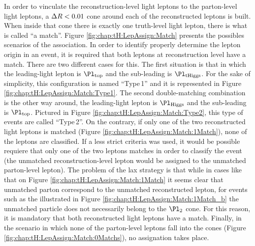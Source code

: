 In order to vinculate the reconstruction-level light leptons to the parton-level light leptons, a \(\Delta R < 0.01\) cone around
each of the reconstructed leptons is built. When inside that cone there is exactly one truth-level light lepton,
there is what is called ``a match''. Figure \ref{fig:chap:tH:LepAssign:Match} presents the possibles scenarios
of the association. In order to identify properly determine the lepton origin in an event, it is required that both leptons
at reconstruction level have a match. There are two different cases for this.
The first situation is that in which the leading-light lepton is $\Pl_{\text{top}}$ and the sub-leading is $\Pl_{\text{tHiggs}}$. For the 
sake of simplicity, this configuration is named ``Type$\,$1'' and it is represented in Figure \ref{fig:chap:tH:LepAssign:Match:Type1}.
The second double-matching combination is the other way around, the leading-light lepton is $\Pl_{\text{Higgs}}$ and the sub-leading 
is $\Pl_{\text{top}}$. Pictured in Figure \ref{fig:chap:tH:LepAssign:Match:Type2}, this type of events are called ``Type$\,$2''.
On the contrary, if only one of the two reconstructed light leptons is matched (Figure \ref{fig:chap:tH:LepAssign:Match:1Match}),
none of the leptons are classified. If a less strict criteria was used, it would be possible requiere that only one of the two leptons
matches in order to classify the event (the unmatched reconstruction-level lepton would be assigned to the unmatched parton-level
lepton). The problem of the lax strategy is that while in cases like that on Figure \ref{fig:chap:tH:LepAssign:Match:1Match} it seems
clear that unmatched parton correspond to the unmatched reconstructed lepton, for events such as the illustrated in
Figure \ref{fig:chap:tH:LepAssign:Match:1Match_b} the unmatched particle does not necessarily belong to the $\Pl_{2}$ cone.
For this reason, it is mandatory that both reconstructed light leptons have a match.
Finally, in the scenario in which none of the parton-level leptons fall into the cones (Figure \ref{fig:chap:tH:LepAssign:Match:0Matchs}), 
no assignation takes place. 



